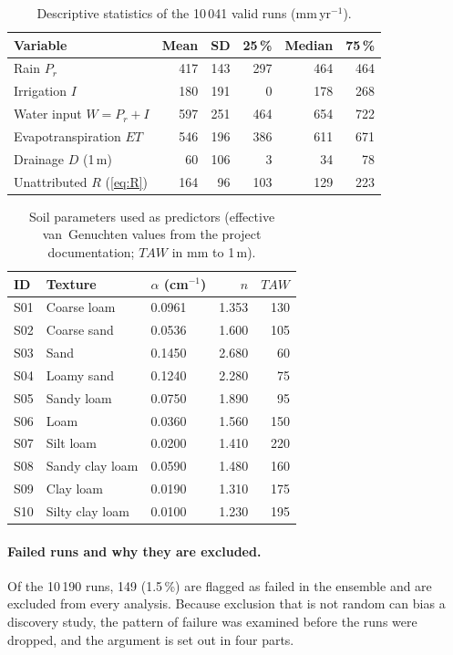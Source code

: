 \documentclass[preprint,12pt,authoryear]{elsarticle}
\newcommand{\TAW}{\mathit{TAW}}
\begin{document}
\begin{table}[H]\centering\small
\caption{Descriptive statistics of the 10\,041 valid runs (mm\,yr$^{-1}$).}
\label{tab:desc}
\begin{tabular}{lrrrrr}
\toprule
Variable & Mean & SD & 25\,\% & Median & 75\,\%\\\midrule
Rain $P_r$ & 417 & 143 & 297 & 464 & 464\\
Irrigation $I$ & 180 & 191 & 0 & 178 & 268\\
Water input $W=P_r+I$ & 597 & 251 & 464 & 654 & 722\\
Evapotranspiration $\mathit{ET}$ & 546 & 196 & 386 & 611 & 671\\
Drainage $D$ (1\,m) & 60 & 106 & 3 & 34 & 78\\
Unattributed $R$ (\cref{eq:R}) & 164 & 96 & 103 & 129 & 223\\\bottomrule
\end{tabular}
\end{table}

\begin{table}[H]\centering\small
\caption{Soil parameters used as predictors (effective van~Genuchten values from the project documentation; $\TAW$ in mm to 1\,m).}
\label{tab:soilsP2}
\begin{tabular}{lllrr}
\toprule
ID & Texture & $\alpha$ (cm$^{-1}$) & $n$ & $\TAW$\\\midrule
S01 & Coarse loam & 0.0961 & 1.353 & 130\\
S02 & Coarse sand & 0.0536 & 1.600 & 105\\
S03 & Sand & 0.1450 & 2.680 & 60\\
S04 & Loamy sand & 0.1240 & 2.280 & 75\\
S05 & Sandy loam & 0.0750 & 1.890 & 95\\
S06 & Loam & 0.0360 & 1.560 & 150\\
S07 & Silt loam & 0.0200 & 1.410 & 220\\
S08 & Sandy clay loam & 0.0590 & 1.480 & 160\\
S09 & Clay loam & 0.0190 & 1.310 & 175\\
S10 & Silty clay loam & 0.0100 & 1.230 & 195\\\bottomrule
\end{tabular}
\end{table}

\paragraph{Failed runs and why they are excluded.}
\label{sec:failed}
Of the 10\,190 runs, 149 (1.5\,\%) are flagged as failed in the ensemble and are excluded from every analysis. Because exclusion that is not random can bias a discovery study, the pattern of failure was examined before the runs were dropped, and the argument is set out in four parts.
\end{document}
